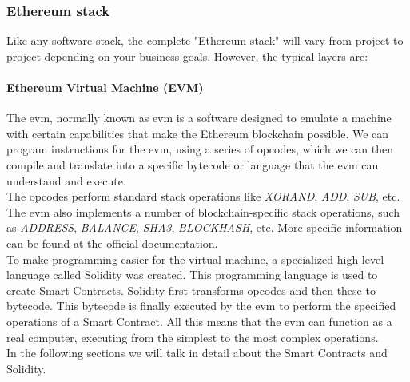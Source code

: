 \subsubsection{Ethereum stack}
Like any software stack, the complete "Ethereum stack"\cite{ethereumStack} will vary from project to project depending on your business goals. However, the typical layers are:
\paragraph{Ethereum Virtual Machine (EVM)}
The \acrlong{evm}\cite{evm}, normally known as \acrshort{evm} is a software designed to emulate a machine with certain capabilities that make the Ethereum blockchain possible. We can program instructions for the \acrshort{evm}, using a series of opcodes, which we can then compile and translate into a specific bytecode or language that the \acrshort{evm} can understand and execute.\\

The opcodes perform standard stack operations like \textit{XORAND}, \textit{ADD}, \textit{SUB}, etc. The \acrshort{evm} also implements a number of blockchain-specific stack operations, such as \textit{ADDRESS}, \textit{BALANCE}, \textit{SHA3}, \textit{BLOCKHASH}, etc. More specific information can be found at the official documentation\cite{opcodes}.\\

To make programming easier for the virtual machine, a specialized high-level language called Solidity was created. This programming language is used to create Smart Contracts. Solidity first transforms opcodes and then these to bytecode. This bytecode is finally executed by the \acrshort{evm} to perform the specified operations of a  Smart Contract. All this means that the \acrshort{evm} can function as a real computer, executing from the simplest to the most complex operations.\\

In the following sections we will talk in detail about the Smart Contracts and Solidity.

